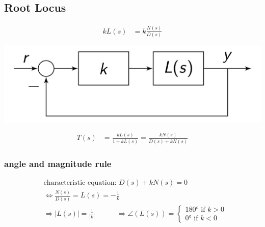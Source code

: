 \subsection{Root Locus}
\begin{minipage}{0.49\linewidth}
    \begin{align*}
        k L(s) &= k\frac{N(s)}{D(s)}
    \end{align*}
\end{minipage}
\begin{minipage}{0.49\linewidth}
    \includegraphics[width = \linewidth]{src/images/closed_loop.png}
\end{minipage}
\begin{align*}
    T(s) &= \frac{k L(s)}{1 + k L(s)} = \frac{k N(s)}{D(s) + k N(s)}
\end{align*}

\subsubsection{angle and magnitude rule}
\begin{align*}
    &\text{characteristic equation: } D(s) + kN(s) = 0\\
    &\Leftrightarrow \frac{N(s)}{D(s)} = L(s) = -\frac{1}{k}\\
    &\Rightarrow |L(s)| = \frac{1}{|k|} \quad \quad \quad
    \Rightarrow \angle(L(s)) = 
    \begin{cases}
        180 \text{° if } k > 0\\
        0 \text{° if } k < 0
    \end{cases}
\end{align*}

